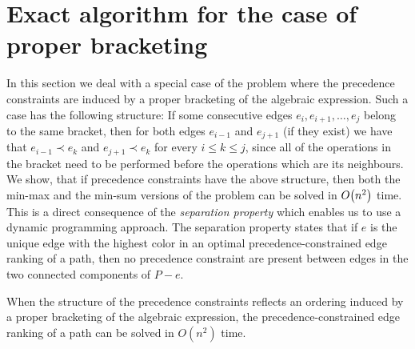 \section{Exact algorithm for the case of proper bracketing}
\label{sec:exact}

In this section we deal with a special case of the problem where the precedence constraints are induced by a proper bracketing of the algebraic expression. Such a case has the following structure: If some consecutive edges $e_i, e_{i+1}, \dots, e_j$ belong to the same bracket, then for both edges $e_{i-1}$ and $e_{j+1}$ (if they exist) we have that $e_{i-1}\prec e_k$ and $e_{j+1}\prec e_k$ for every $i\leq k \leq j$, since all of the operations in the bracket need to be performed before the operations which are its neighbours. We show, that if precedence constraints have the above structure, then both the min-max and the min-sum versions of the problem can be solved in $O\mathopen{}\left( n^2 \right)$ time. This is a direct consequence of the \emph{separation property} which enables us to use a dynamic programming approach. The separation property states that if $e$ is the unique edge with the highest color in an optimal precedence-constrained edge ranking of a path, then no precedence constraint are present between edges in the two connected components of $P-e$. 
\begin{theorem}
\label{thm:proper-bracketing}
When the structure of the precedence constraints reflects an ordering induced by a proper bracketing of the algebraic expression, the precedence-constrained edge ranking of a path can be solved in $O(n^2)$ time.
\end{theorem}
